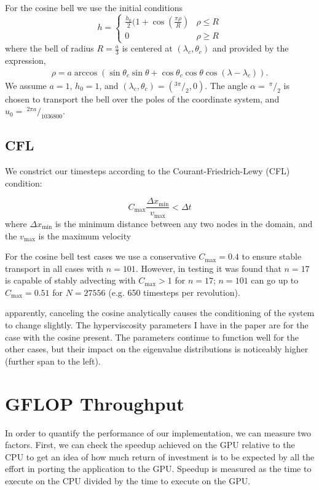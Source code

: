 \documentclass{report}
\begin{document}
For the cosine bell we use the initial conditions
\begin{equation*}
h  = 
\begin{cases} 
\frac{h_0}{2} (1 + \cos(\frac{\pi \rho}{R})  & \rho \le R  \\
 0 &  \rho \geq R 
\end{cases}
\end{equation*}
where the bell of radius $R = \frac{a}{3}$ is centered at $(\lambda_c, \theta_c)$ and provided by the expression,
\begin{eqnarray*}
\rho = a \arccos( \sin \theta_{c} \sin \theta + \cos \theta_{c} \cos \theta \cos (\lambda - \lambda_{c}) ).
\end{eqnarray*}
We assume $a = 1$, $h_0 = 1$, and $(\lambda_c, \theta_c) = (^{3\pi}/_{2}, 0)$. The angle $\alpha =\ ^{\pi}/_{2}$ is chosen to transport the bell over the poles of the coordinate system, and $u_0 =\ ^{2 \pi a}/_{1036800}$. 



\subsection{CFL}
We constrict our timesteps according to the Courant-Friedrich-Lewy (CFL) condition: 

$$
C_{\text{max}} \frac{\Delta x_{\text{min}}}{v_{\text{max}}} < \Delta t
$$
where $\Delta x_{\text{min}}$ is the minimum distance between any two nodes in the domain, and the $v_{\text{max}}$ is the maximum velocity 

For the cosine bell test cases we use a conservative $C_{\text{max}} = 0.4$ to ensure stable transport in all cases with $n=101$. However, in testing it was found that $n=17$ is capable of stably advecting with $C_{\text{max}} > 1$ for $n=17$; $n=101$ can go up to $C_{\text{max}} = 0.51$ for $N=27556$ (e.g. 650 timesteps per revolution). 


apparently, canceling the cosine analytically causes the conditioning of the system to change slightly. The hyperviscosity parameters I have in the paper are for the case with the cosine present. The parameters continue to function well for the other cases, but their impact on the eigenvalue distributions is noticeably higher (further span to the left). 


\section{GFLOP Throughput}
In order to quantify the performance of our implementation, we can measure two
factors. First, we can check the speedup achieved on the GPU relative to the
CPU to get an idea of how much return of investment is to be expected by all
the effort in porting the application to the GPU. Speedup is measured as the
time to execute on the CPU divided by the time to execute on the GPU. 
\end{document}
